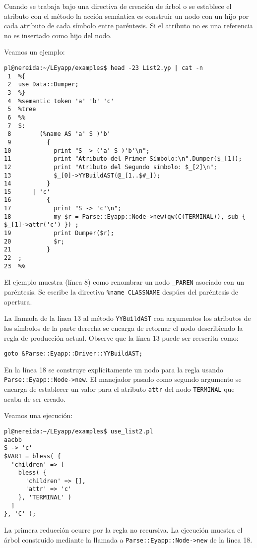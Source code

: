 Cuando se trabaja bajo una directiva de creación de árbol o se establece
el atributo con el método  la
acción semántica es construir
un nodo con un hijo por cada 
atributo de cada símbolo entre paréntesis. Si el
atributo no es una referencia no es insertado 
como hijo del nodo.

Veamos un ejemplo:
\begin{verbatim}
pl@nereida:~/LEyapp/examples$ head -23 List2.yp | cat -n
 1  %{
 2  use Data::Dumper;
 3  %}
 4  %semantic token 'a' 'b' 'c'
 5  %tree
 6  %%
 7  S:
 8        (%name AS 'a' S )'b'
 9          {
10            print "S -> ('a' S )'b'\n";
11            print "Atributo del Primer Símbolo:\n".Dumper($_[1]);
12            print "Atributo del Segundo símbolo: $_[2]\n";
13            $_[0]->YYBuildAST(@_[1..$#_]);
14          }
15      | 'c'
16          {
17            print "S -> 'c'\n";
18            my $r = Parse::Eyapp::Node->new(qw(C(TERMINAL)), sub { $_[1]->attr('c') }) ;
19            print Dumper($r);
20            $r;
21          }
22  ;
23  %%
\end{verbatim}
El ejemplo muestra (línea 8) 
como renombrar un nodo \verb|_PAREN| asociado con un paréntesis.
Se escribe la directiva \verb|%name CLASSNAME| despúes del paréntesis de
apertura.

La llamada de la línea 13 al método \verb|YYBuildAST| con 
argumentos los atributos de los símbolos de la parte derecha se encarga de
retornar el nodo describiendo la regla de producción actual.
Observe que la línea 13 puede ser reescrita como:
\begin{verbatim}
goto &Parse::Eyapp::Driver::YYBuildAST;
\end{verbatim}

En la línea 18 se construye explícitamente un nodo para la regla
usando \verb|Parse::Eyapp::Node->new|. El manejador pasado
como segundo argumento se encarga de establecer un valor para
el atributo \verb|attr| del nodo \verb|TERMINAL| que acaba de ser creado.

Veamos una ejecución:

\begin{verbatim}
pl@nereida:~/LEyapp/examples$ use_list2.pl
aacbb
S -> 'c'
$VAR1 = bless( {
  'children' => [
    bless( {
      'children' => [],
      'attr' => 'c'
    }, 'TERMINAL' )
  ]
}, 'C' );
\end{verbatim}
La primera reducción ocurre por la regla no recursiva. La 
ejecución muestra el árbol construido mediante
la llamada a 
\verb|Parse::Eyapp::Node->new|
de la línea 18.

